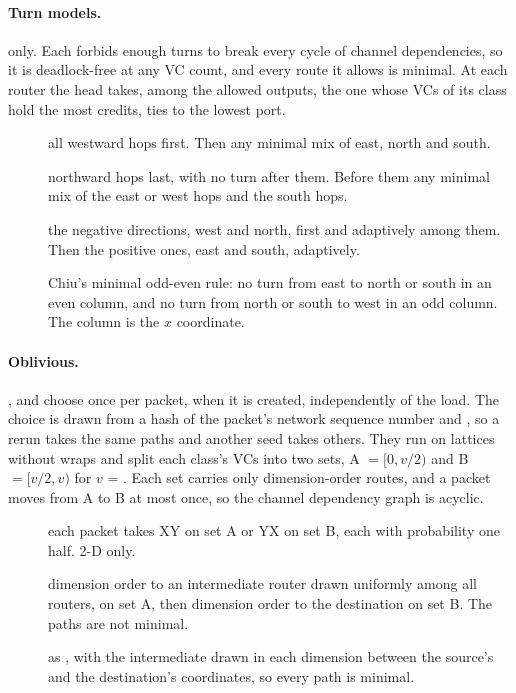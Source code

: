 \paragraph{Turn models.}  only. Each forbids enough turns to break every cycle of
channel dependencies, so it is deadlock-free at any VC count, and every route it allows is
minimal. At each router the head takes, among the allowed outputs, the one whose VCs of its class
hold the most credits, ties to the lowest port.
\begin{description}
\item[] all westward hops first. Then any minimal mix of east, north and south.
\item[] northward hops last, with no turn after them. Before them any minimal mix
  of the east or west hops and the south hops.
\item[] the negative directions, west and north, first and adaptively among
  them. Then the positive ones, east and south, adaptively.
\item[] Chiu's minimal odd-even rule: no turn from east to north or south in an even
  column, and no turn from north or south to west in an odd column. The column is the $x$
  coordinate.
\end{description}

\paragraph{Oblivious.} ,  and  choose once per packet,
when it is created, independently of the load. The choice is drawn from a hash of the packet's
network sequence number and , so a rerun takes the same paths and another seed
takes others. They run on lattices without wraps and split each class's VCs into two sets,
A $= [0, v/2)$ and B $= [v/2, v)$ for $v$ = . Each set carries only
dimension-order routes, and a packet moves from A to B at most once, so the channel dependency
graph is acyclic.
\begin{description}
\item[] each packet takes XY on set A or YX on set B, each with probability one half.
  2-D only.
\item[] dimension order to an intermediate router drawn uniformly among all
  routers, on set A, then dimension order to the destination on set B. The paths are not minimal.
\item[] as , with the intermediate drawn in each dimension between the
  source's and the destination's coordinates, so every path is minimal.
\end{description}

